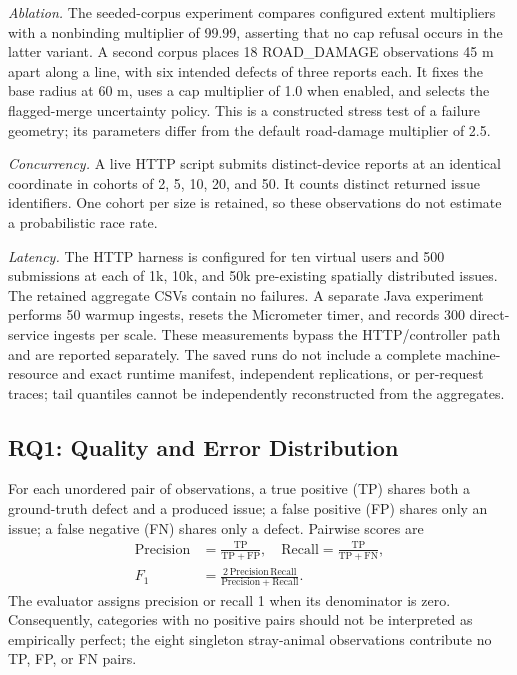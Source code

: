 \documentclass[conference,a4paper]{IEEEtran}
\begin{document}
\textit{Ablation.} The seeded-corpus experiment compares configured extent multipliers with a nonbinding multiplier of 99.99, asserting that no cap refusal occurs in the latter variant. A second corpus places 18 ROAD\_DAMAGE observations 45 m apart along a line, with six intended defects of three reports each. It fixes the base radius at 60 m, uses a cap multiplier of 1.0 when enabled, and selects the flagged-merge uncertainty policy. This is a constructed stress test of a failure geometry; its parameters differ from the default road-damage multiplier of 2.5.

\textit{Concurrency.} A live HTTP script submits distinct-device reports at an identical coordinate in cohorts of 2, 5, 10, 20, and 50. It counts distinct returned issue identifiers. One cohort per size is retained, so these observations do not estimate a probabilistic race rate.

\textit{Latency.} The HTTP harness is configured for ten virtual users and 500 submissions at each of 1k, 10k, and 50k pre-existing spatially distributed issues. The retained aggregate CSVs contain no failures. A separate Java experiment performs 50 warmup ingests, resets the Micrometer timer, and records 300 direct-service ingests per scale. These measurements bypass the HTTP/controller path and are reported separately. The saved runs do not include a complete machine-resource and exact runtime manifest, independent replications, or per-request traces; tail quantiles cannot be independently reconstructed from the aggregates.

\subsection{RQ1: Quality and Error Distribution}
For each unordered pair of observations, a true positive (TP) shares both a ground-truth defect and a produced issue; a false positive (FP) shares only an issue; a false negative (FN) shares only a defect. Pairwise scores are
\begin{equation}
 \begin{aligned}
 \mathrm{Precision}&=\frac{\mathrm{TP}}{\mathrm{TP}+\mathrm{FP}},\quad
 \mathrm{Recall}=\frac{\mathrm{TP}}{\mathrm{TP}+\mathrm{FN}},\\
 F_1&=\frac{2\,\mathrm{Precision}\,\mathrm{Recall}}
 {\mathrm{Precision}+\mathrm{Recall}}.
 \end{aligned}
 \label{eq:metrics}
\end{equation}
The evaluator assigns precision or recall 1 when its denominator is zero. Consequently, categories with no positive pairs should not be interpreted as empirically perfect; the eight singleton stray-animal observations contribute no TP, FP, or FN pairs.
\end{document}
